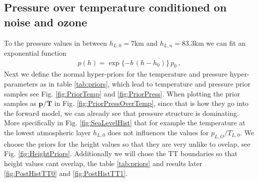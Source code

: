\subsection{Pressure over temperature conditioned on noise and ozone}
\label{subsec:presTempPrior}
To the pressure values in between $h_{L,0}=7$km and $h_{L,n} = 83.3$km we can fit an exponential function
\begin{align}
	p(h) =
	\exp{ \{ -b \,  (h - h_{0} ) \} } \,  p_0 \, ,
	\label{eq:pressFunc}
\end{align}
Next we define the normal hyper-priors for the temperature and pressure hyper-parameters as in table \ref{tab:priors}, which lead to temperature and pressure prior samples see Fig. \ref{fig:PriorTemp} and \ref{fig:PriorPress}.
When plotting the prior samples as $\bm{p} / \bm{T}$ in Fig. \ref{fig:PriorPressOverTemp}, since that is how they go into the forward model, we can already see that pressure structure is dominating.
More specifically in Fig. \ref{fig:SeaLevelHist} that for example the temperature at the lowest atmospheric layer $h_{L,0}$ does not influences the values for $p_{L,O}/T_{L,0}$.
We choose the priors for the height values so that they are very unlike to ovelap, see Fig. \ref{fig:HeightPriors}.
Additionally we will chose the TT boundaries so that height values cant overlap, the table \ref{tab:priors} and results later \ref{fig:PostHistTT0} and \ref{fig:PostHistTT1}.

